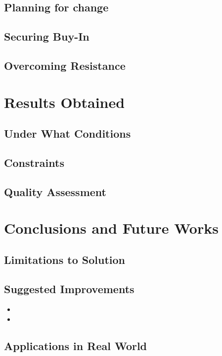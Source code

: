 \documentclass{article}
\begin{document}
\subsection{Planning for change}
\lipsum[17]

\subsection{Securing Buy-In}
\lipsum[18]

\subsection{Overcoming Resistance}
\lipsum[19]


\section{Results Obtained}
\subsection{Under What Conditions}
\lipsum[21]

\subsection{Constraints}
\lipsum[22]

\subsection{Quality Assessment}
\lipsum[23]

\section{Conclusions and Future Works}
\subsection{Limitations to Solution}
\lipsum[24]

\subsection{Suggested Improvements}
\begin{itemize}
  \item \lipsum[25]
  \item \lipsum[26]
\end{itemize}

\subsection{Applications in Real World}
\lipsum[27]
\end{document}
